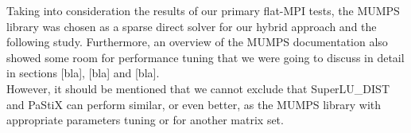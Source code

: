 Taking into consideration the results of our primary flat-MPI tests, the MUMPS library was chosen as a sparse direct solver for our hybrid approach and the following study. Furthermore, an overview of the MUMPS documentation also showed some room for performance tuning that we were going to discuss in detail in sections [bla], [bla] and  [bla].\\


However, it should be mentioned that we cannot exclude that SuperLU\_DIST  and PaStiX can perform similar, or even better, as the MUMPS library with appropriate parameters tuning or for another matrix set.\\
